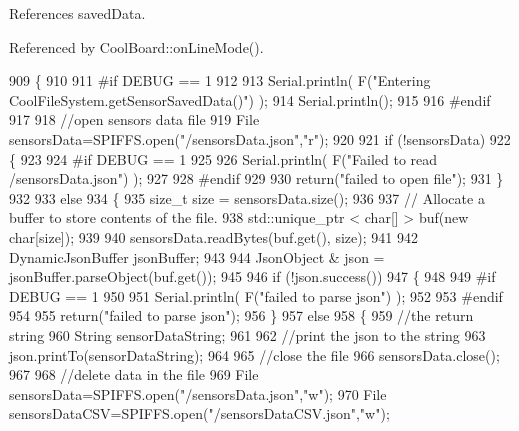 References saved\+Data.



Referenced by Cool\+Board\+::on\+Line\+Mode().


\begin{DoxyCode}
909 \{
910 
911 \textcolor{preprocessor}{#if DEBUG == 1 }
912 
913     Serial.println( F(\textcolor{stringliteral}{"Entering CoolFileSystem.getSensorSavedData()"}) );
914     Serial.println();
915 
916 \textcolor{preprocessor}{#endif}
917 
918     \textcolor{comment}{//open sensors data file}
919     File sensorsData=SPIFFS.open(\textcolor{stringliteral}{"/sensorsData.json"},\textcolor{stringliteral}{"r"});
920     
921     \textcolor{keywordflow}{if} (!sensorsData)
922     \{
923 
924 \textcolor{preprocessor}{    #if DEBUG == 1 }
925 
926         Serial.println( F(\textcolor{stringliteral}{"Failed to read /sensorsData.json"}) );
927 
928 \textcolor{preprocessor}{    #endif}
929  
930         \textcolor{keywordflow}{return}(\textcolor{stringliteral}{"failed to open file"});
931     \}
932 
933     \textcolor{keywordflow}{else}
934     \{
935         \textcolor{keywordtype}{size\_t} size = sensorsData.size();
936 
937         \textcolor{comment}{// Allocate a buffer to store contents of the file.}
938         std::unique\_ptr < char[] > buf(\textcolor{keyword}{new} \textcolor{keywordtype}{char}[size]);
939 
940         sensorsData.readBytes(buf.get(), size);
941 
942         DynamicJsonBuffer jsonBuffer;
943 
944         JsonObject & json = jsonBuffer.parseObject(buf.get());
945         
946         \textcolor{keywordflow}{if} (!json.success())
947         \{
948 
949 \textcolor{preprocessor}{        #if DEBUG == 1}
950         
951             Serial.println( F(\textcolor{stringliteral}{"failed to parse json"}) );
952         
953 \textcolor{preprocessor}{        #endif}
954         
955             \textcolor{keywordflow}{return}(\textcolor{stringliteral}{"failed to parse json"});
956         \}
957         \textcolor{keywordflow}{else}
958         \{   
959             \textcolor{comment}{//the return string}
960             String sensorDataString;
961             
962             \textcolor{comment}{//print the json to the string}
963             json.printTo(sensorDataString);
964             
965             \textcolor{comment}{//close the file}
966             sensorsData.close();
967 
968             \textcolor{comment}{//delete data in the file}
969             File sensorsData=SPIFFS.open(\textcolor{stringliteral}{"/sensorsData.json"},\textcolor{stringliteral}{"w"});
970             File sensorsDataCSV=SPIFFS.open(\textcolor{stringliteral}{"/sensorsDataCSV.json"},\textcolor{stringliteral}{"w"});

\end{DoxyCode}
